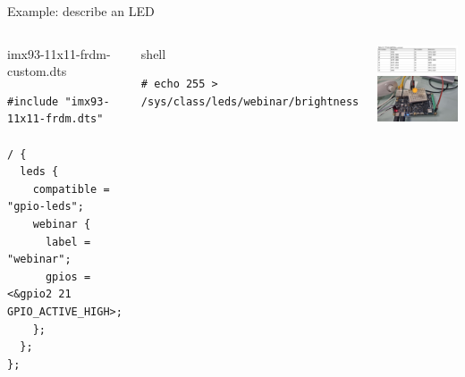 \begin{frame}[fragile]{Example: describe an LED}
  \begin{columns}
  \begin{block}{imx93-11x11-frdm-custom.dts}
    {\tiny
\begin{verbatim}
#include "imx93-11x11-frdm.dts"

/ {
  leds {
    compatible = "gpio-leds";
    webinar {
      label = "webinar";
      gpios = <&gpio2 21 GPIO_ACTIVE_HIGH>;
    };
  };
};
\end{verbatim}
      }
  \end{block}
  \begin{block}{shell}
{\tiny
\begin{verbatim}
# echo 255 > /sys/class/leds/webinar/brightness
\end{verbatim}
}
\end{block}
  \begin{center}
    \includegraphics[height=0.3\textheight]{slides/sysdev-hw-devices/imx93-frdm/imx93-tab-gpio21.png}\\
    \vspace{0.5cm}
    \includegraphics[height=0.3\textheight]{slides/sysdev-hw-devices/imx93-frdm/led-on.jpg}
  \end{center}
  \end{columns}
\end{frame}


